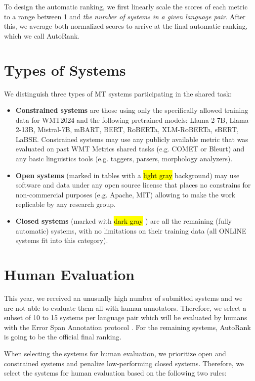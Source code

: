 \documentclass[11pt]{article}
\newcommand{\hlc}[2][yellow]{{%
    \colorlet{foo}{#1}%
    \sethlcolor{foo}\hl{#2}}%
}
\begin{document}
To design the automatic ranking, we first linearly scale the scores of each metric to a range between 1 and \textit{the number of systems in a given language pair}.
After this, we average both normalized scores to arrive at the final automatic ranking, which we call AutoRank.

\section*{Types of Systems}
We distinguish three types of MT systems participating in the shared task:
\begin{itemize}%
\item \textbf{Constrained systems} are those using only the specifically allowed training data for WMT2024 and the following pretrained models:
Llama-2-7B, Llama-2-13B, Mistral-7B, mBART, BERT, RoBERTa, XLM-RoBERTa, sBERT, LaBSE. Constrained systems may use any publicly available metric that was evaluated on past WMT Metrics shared tasks (e.g. COMET or Bleurt) and any basic linguistics tools (e.g. taggers, parsers, morphology analyzers).

\item \textbf{Open systems} (marked in tables with a \hlc[gray!20]{light gray} background) may use software and data under any open source license that places no constrains for non-commercial purposes (e.g. Apache, MIT) allowing to make the work replicable by any research group.

\item \textbf{Closed systems} (marked with \hlc[gray!50]{dark gray}) are all the remaining (fully automatic) systems, with no limitations on their training data (all ONLINE systems fit into this category).
\end{itemize}

\section*{Human Evaluation}

This year, we received an unusually high number of submitted systems and we are not able to evaluate them all with human annotators.
Therefore, we select a subset of 10 to 15 systems per language pair which will be evaluated by humans with the Error Span Annotation protocol \citep{kocmi2024errorspanannotationbalanced}.
For the remaining systems, AutoRank is going to be the official final ranking.

When selecting the systems for human evaluation, we prioritize open and constrained systems and penalize low-performing closed systems.
Therefore, we select the systems for human evaluation based on the following two rules:
\end{document}
